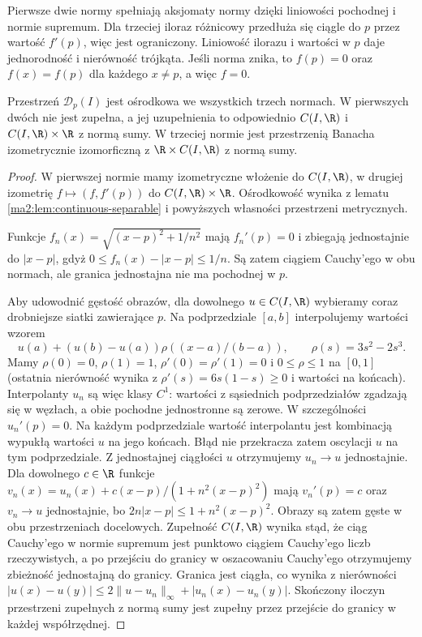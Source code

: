 Pierwsze dwie normy spełniają aksjomaty normy
dzięki liniowości pochodnej i normie supremum.
Dla trzeciej iloraz różnicowy przedłuża się
ciągle do $p$ przez wartość $f'(p)$, więc jest
ograniczony. Liniowość ilorazu i wartości w $p$
daje jednorodność i nierówność trójkąta.
Jeśli norma znika, to $f(p)=0$ oraz $f(x)=f(p)$
dla każdego $x\ne p$, a więc $f=0$.

\begin{twierdzenie}
\label{ma2:thm:point-differentiable-norms}
Przestrzeń $\mathcal D_p(I)$ jest ośrodkowa
we wszystkich trzech normach. W pierwszych dwóch
nie jest zupełna, a jej uzupełnienia to odpowiednio
$C(I,\R)$ i $C(I,\R)\times\R$ z normą sumy.
W trzeciej normie jest przestrzenią Banacha
izometrycznie izomorficzną z $\R\times C(I,\R)$
z normą sumy.
\end{twierdzenie}
\begin{proof}
W pierwszej normie mamy izometryczne włożenie do
$C(I,\R)$, w drugiej izometrię $f\mapsto(f,f'(p))$
do $C(I,\R)\times\R$. Ośrodkowość wynika z lematu
\ref{ma2:lem:continuous-separable} i powyższych
własności przestrzeni metrycznych.

Funkcje $f_n(x)=\sqrt{(x-p)^2+1/n^2}$ mają
$f_n'(p)=0$ i zbiegają jednostajnie do $|x-p|$,
gdyż $0\le f_n(x)-|x-p|\le1/n$.
Są zatem ciągiem Cauchy'ego w obu normach,
ale granica jednostajna nie ma pochodnej w $p$.

Aby udowodnić gęstość obrazów, dla dowolnego
$u\in C(I,\R)$ wybieramy coraz drobniejsze
siatki zawierające $p$. Na podprzedziale
$[a,b]$ interpolujemy wartości wzorem
\[
 u(a)+(u(b)-u(a))\rho((x-a)/(b-a)),
 \qquad \rho(s)=3s^2-2s^3.
\]
Mamy $\rho(0)=0$, $\rho(1)=1$,
$\rho'(0)=\rho'(1)=0$ i $0\le\rho\le1$
na $[0,1]$ (ostatnia nierówność wynika z
$\rho'(s)=6s(1-s)\ge0$ i wartości na końcach).
Interpolanty $u_n$ są więc klasy $C^1$:
wartości z sąsiednich podprzedziałów zgadzają się
w węzłach, a obie pochodne jednostronne są zerowe.
W szczególności $u_n'(p)=0$. Na każdym
podprzedziale wartość interpolantu jest kombinacją
wypukłą wartości $u$ na jego końcach. Błąd nie
przekracza zatem oscylacji $u$ na tym podprzedziale.
Z jednostajnej ciągłości $u$ otrzymujemy
$u_n\to u$ jednostajnie.
Dla dowolnego $c\in\R$ funkcje
$v_n(x)=u_n(x)+c(x-p)/(1+n^2(x-p)^2)$
mają $v_n'(p)=c$ oraz $v_n\to u$ jednostajnie,
bo $2n|x-p|\le1+n^2(x-p)^2$.
Obrazy są zatem gęste w obu przestrzeniach
docelowych. Zupełność $C(I,\R)$ wynika stąd, że
ciąg Cauchy'ego w normie supremum jest punktowo
ciągiem Cauchy'ego liczb rzeczywistych, a po
przejściu do granicy w oszacowaniu Cauchy'ego
otrzymujemy zbieżność jednostajną do granicy.
Granica jest ciągła, co wynika z nierówności
$|u(x)-u(y)|\le 2\|u-u_n\|_\infty+|u_n(x)-u_n(y)|$.
Skończony iloczyn przestrzeni zupełnych z normą
sumy jest zupełny przez przejście do granicy
w każdej współrzędnej.


\end{proof}
